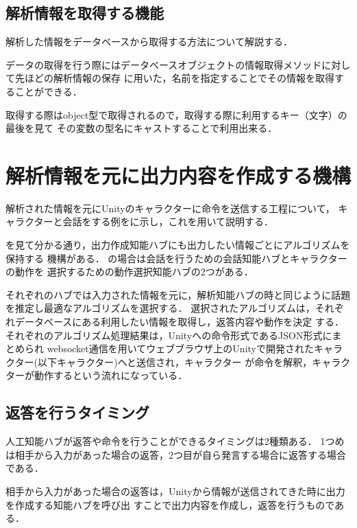 \subsection{解析情報を取得する機能}
解析した情報をデータベースから取得する方法について解説する．

データの取得を行う際にはデータベースオブジェクトの情報取得メソッドに対して先ほどの解析情報の保存
に用いた，名前を指定することでその情報を取得することができる．

取得する際はobject型で取得されるので，取得する際に利用するキー（文字）の最後を見て
その変数の型名にキャストすることで利用出来る．

\newpage

\section{解析情報を元に出力内容を作成する機構}
解析された情報を元にUnityのキャラクターに命令を送信する工程について，
キャラクターと会話をする例をに示し，これを用いて説明する．


を見て分かる通り，出力作成知能ハブにも出力したい情報ごとにアルゴリズムを保持する
機構がある．
の場合は会話を行うための会話知能ハブとキャラクターの動作を
選択するための動作選択知能ハブの2つがある．

それぞれのハブでは入力された情報を元に，解析知能ハブの時と同じように話題を推定し最適なアルゴリズムを選択する．
選択されたアルゴリズムは，それぞれデータベースにある利用したい情報を取得し，返答内容や動作を決定
する．
それぞれのアルゴリズム処理結果は，Unityへの命令形式であるJSON形式にまとめられ
websocket通信を用いてウェブブラウザ上のUnityで開発されたキャラクター(以下キャラクター)へと送信され，キャラクター
が命令を解釈，キャラクターが動作するという流れになっている．

\subsection{返答を行うタイミング}
人工知能ハブが返答や命令を行うことができるタイミングは2種類ある．
1つめは相手から入力があった場合の返答，2つ目が自ら発言する場合に返答する場合である．

相手から入力があった場合の返答は，Unityから情報が送信されてきた時に出力を作成する知能ハブを呼び出
すことで出力内容を作成し，返答を行うものである．

